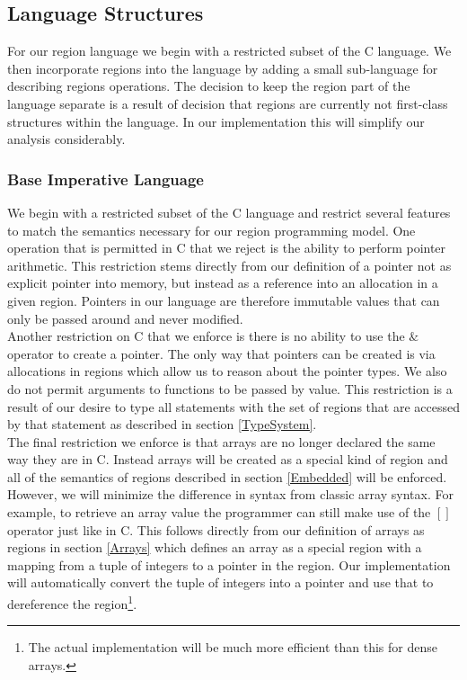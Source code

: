 \documentclass{article}
\theoremstyle{definition}
\begin{document}
\subsection{Language Structures \label{LangStructures}}
\noindent
For our region language we begin with a restricted subset of the C language.  We then
incorporate regions into the language by adding a small sub-language for describing
regions operations.  The decision to keep the region part of the language separate
is a result of decision that regions are currently not first-class structures within
the language.  In our implementation this will simplify our analysis considerably.

\subsubsection{Base Imperative Language \label{Imperative}}
\noindent
We begin with a restricted subset of the C language and restrict several features
to match the semantics necessary for our region programming model.  One
operation that is permitted in C that we reject is the ability to perform pointer
arithmetic.  This restriction stems directly from our definition of a pointer not as
explicit pointer into memory, but instead as a reference into an allocation in a given
region.  Pointers in our language are therefore immutable values that can only be passed
around and never modified.\\

\noindent
Another restriction on C that we enforce is there is no ability to use the $\&$ operator 
to create a pointer.  The only way that pointers can be created is via allocations in
regions which allow us to reason about the pointer types.  We also do not permit arguments
to functions to be passed by value.  This restriction is a result of our desire to type
all statements with the set of regions that are accessed by that statement as described
in section \ref{TypeSystem}. \\

\noindent
The final restriction we enforce is that arrays are no longer declared the same way they
are in C.  Instead arrays will be created as a special kind of region and all of the
semantics of regions described in section \ref{Embedded} will be enforced.  However, we
will minimize the difference in syntax from classic array syntax.  For example, to retrieve
an array value the programmer can still make use of the $[]$ operator just like in C.  This
follows directly from our definition of arrays as regions in section \ref{Arrays} which
defines an array as a special region with a mapping from a tuple of integers to a pointer
in the region.  Our implementation will automatically convert the tuple of integers into
a pointer and use that to dereference the region\footnote{The actual implementation will
be much more efficient than this for dense arrays.}.
\end{document}
